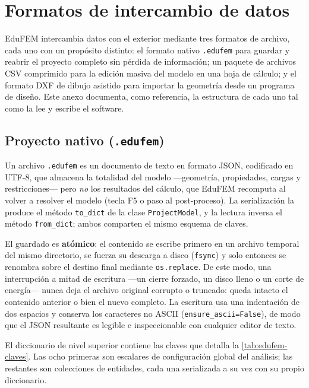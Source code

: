 \chapter{Formatos de intercambio de datos}
\label{anexo:formatos}

EduFEM intercambia datos con el exterior mediante tres formatos de archivo, cada uno con un propósito distinto: el formato nativo \texttt{.edufem} para guardar y reabrir el proyecto completo sin pérdida de información; un paquete de archivos CSV comprimido para la edición masiva del modelo en una hoja de cálculo; y el formato DXF de dibujo asistido para importar la geometría desde un programa de diseño. Este anexo documenta, como referencia, la estructura de cada uno tal como la lee y escribe el software.

\section{Proyecto nativo (\texttt{.edufem})}

Un archivo \texttt{.edufem} es un documento de texto en formato JSON, codificado en UTF-8, que almacena la totalidad del modelo ---geometría, propiedades, cargas y restricciones--- pero \emph{no} los resultados del cálculo, que EduFEM recomputa al volver a resolver el modelo (tecla F5 o paso al post-proceso). La serialización la produce el método \texttt{to\_dict} de la clase \texttt{ProjectModel}, y la lectura inversa el método \texttt{from\_dict}; ambos comparten el mismo esquema de claves.

El guardado es \textbf{atómico}: el contenido se escribe primero en un archivo temporal del mismo directorio, se fuerza su descarga a disco (\texttt{fsync}) y solo entonces se renombra sobre el destino final mediante \texttt{os.replace}. De este modo, una interrupción a mitad de escritura ---un cierre forzado, un disco lleno o un corte de energía--- nunca deja el archivo original corrupto o truncado: queda intacto el contenido anterior o bien el nuevo completo. La escritura usa una indentación de dos espacios y conserva los caracteres no ASCII (\texttt{ensure\_ascii=False}), de modo que el JSON resultante es legible e inspeccionable con cualquier editor de texto.

El diccionario de nivel superior contiene las claves que detalla la \autoref{tab:edufem-claves}. Las ocho primeras son escalares de configuración global del análisis; las restantes son colecciones de entidades, cada una serializada a su vez con su propio diccionario.

